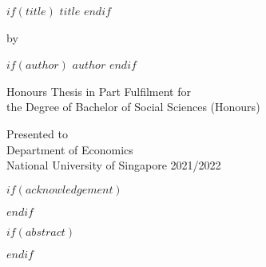 \documentclass[12pt]{article}
\begin{document}
\begin{titlepage}
    \begin{center}
        \vspace*{1cm}

        $if(title)$
            \large{\textbf{\uppercase{$title$}}}
        $endif$

        \vfill

        by

        $if(author)$
            \textbf{\uppercase{$author$}}
        $endif$

        \vfill

        Honours Thesis in Part Fulfilment for\\
        the Degree of Bachelor of Social Sciences (Honours)

        \vspace{0.8cm}


        Presented to\\
        Department of Economics\\
        National University of Singapore 2021/2022

    \end{center}
\end{titlepage}

\fancyfoot[C]{\thepage}
\setlength{\headheight}{15pt}

\newpage
\renewcommand{\abstractname}{\underline{\uppercase{acknowledgement}}}

    $if(acknowledgement)$
    \begin{abstract}
        $acknowledgement$
    \end{abstract}
    $endif$

\newpage


\renewcommand{\abstractname}{\underline{\uppercase{abstract}}}

\newpage
    \begin{centering}

        $if(abstract)$
        \begin{abstract}
            $abstract$
        \end{abstract}

        $endif$


    \end{centering}

    \vfill
\end{document}
